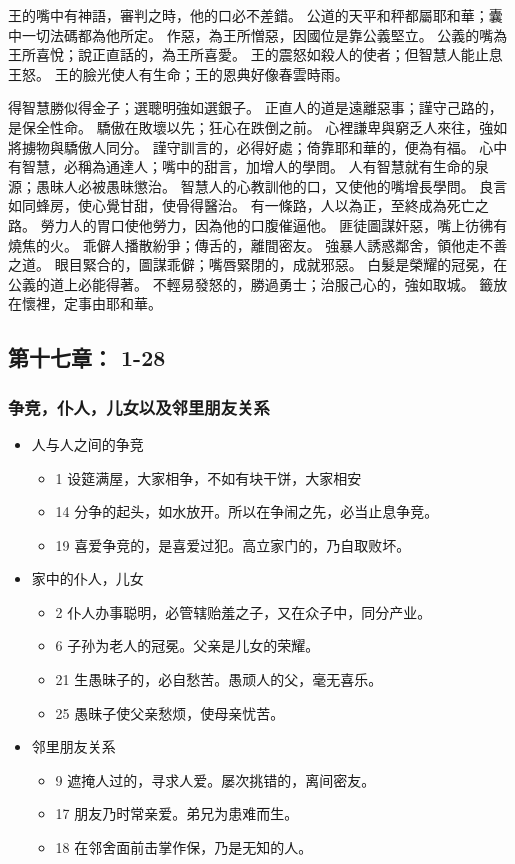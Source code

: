 王的嘴中有神語，審判之時，他的口必不差錯。
公道的天平和秤都屬耶和華；囊中一切法碼都為他所定。
作惡，為王所憎惡，因國位是靠公義堅立。
公義的嘴為王所喜悅；說正直話的，為王所喜愛。
王的震怒如殺人的使者；但智慧人能止息王怒。
王的臉光使人有生命；王的恩典好像春雲時雨。

得智慧勝似得金子；選聰明強如選銀子。
正直人的道是遠離惡事；謹守己路的，是保全性命。
驕傲在敗壞以先；狂心在跌倒之前。
心裡謙卑與窮乏人來往，強如將擄物與驕傲人同分。
謹守訓言的，必得好處；倚靠耶和華的，便為有福。
心中有智慧，必稱為通達人；嘴中的甜言，加增人的學問。
人有智慧就有生命的泉源；愚昧人必被愚昧懲治。
智慧人的心教訓他的口，又使他的嘴增長學問。
良言如同蜂房，使心覺甘甜，使骨得醫治。
有一條路，人以為正，至終成為死亡之路。
勞力人的胃口使他勞力，因為他的口腹催逼他。
匪徒圖謀奸惡，嘴上彷彿有燒焦的火。
乖僻人播散紛爭；傳舌的，離間密友。
強暴人誘惑鄰舍，領他走不善之道。
眼目緊合的，圖謀乖僻；嘴唇緊閉的，成就邪惡。
白髮是榮耀的冠冕，在公義的道上必能得著。
不輕易發怒的，勝過勇士；治服己心的，強如取城。
籤放在懷裡，定事由耶和華。

\subsection{第十七章：    1-28}
\subsubsection{争竞，仆人，儿女以及邻里朋友关系}
\begin{itemize}
\itemsep-.45em  
\item 人与人之间的争竞
\begin{itemize}
\itemsep-.45em 
\item 1 设筵满屋，大家相争，不如有块干饼，大家相安 
\item 14 分争的起头，如水放开。所以在争闹之先，必当止息争竞。
\item 19 喜爱争竞的，是喜爱过犯。高立家门的，乃自取败坏。
\end{itemize}
\item 家中的仆人，儿女
\begin{itemize}
\itemsep-.45em 
\item 2 仆人办事聪明，必管辖贻羞之子，又在众子中，同分产业。 
\item 6 子孙为老人的冠冕。父亲是儿女的荣耀。 
\item 21 生愚昧子的，必自愁苦。愚顽人的父，毫无喜乐。
\item 25 愚昧子使父亲愁烦，使母亲忧苦。
\end{itemize}
\item 邻里朋友关系
\begin{itemize}
\itemsep-.45em 
\item 9 遮掩人过的，寻求人爱。屡次挑错的，离间密友。
\item 17 朋友乃时常亲爱。弟兄为患难而生。
\item 18 在邻舍面前击掌作保，乃是无知的人。
\end{itemize}
\end{itemize}

